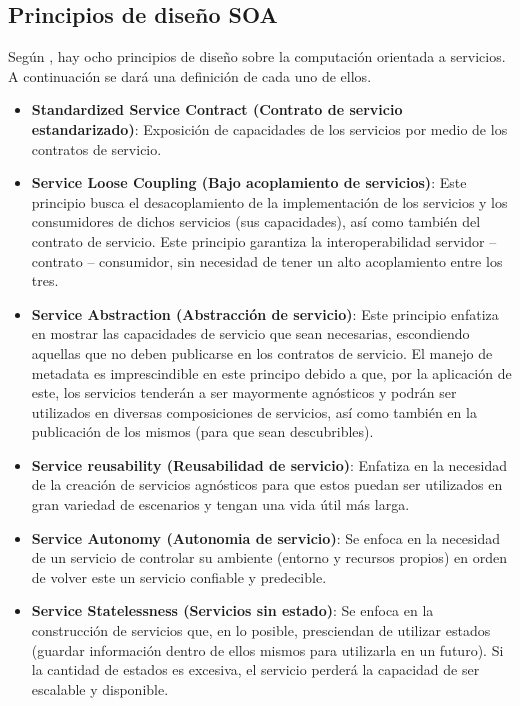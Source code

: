 \subsection{Principios de diseño SOA}

Según \cite{soa_principles}, hay ocho principios de diseño sobre la computación orientada a servicios. A continuación se dará una definición de cada uno de ellos.

\begin{itemize}
  \item \textbf{Standardized Service Contract (Contrato de servicio estandarizado)}: Exposición de capacidades de los servicios por medio de los contratos de servicio.

 \item \textbf{Service Loose Coupling (Bajo acoplamiento de servicios)}: Este principio busca el desacoplamiento de la implementación de los servicios y los consumidores de dichos servicios (sus capacidades), así como también del contrato de servicio. Este principio garantiza la interoperabilidad servidor – contrato – consumidor, sin necesidad de tener un alto acoplamiento entre los tres.

 \item \textbf{Service Abstraction (Abstracción de servicio)}: Este principio enfatiza en mostrar las capacidades de servicio que sean necesarias, escondiendo aquellas que no deben publicarse en los contratos de servicio. El manejo de metadata es imprescindible en este principo debido a que, por la aplicación de este, los servicios tenderán a ser mayormente agnósticos y podrán ser utilizados en diversas composiciones de servicios, así como también en la publicación de los mismos (para que sean descubribles).

 \item \textbf{Service reusability (Reusabilidad de servicio)}: Enfatiza en la necesidad de la creación de servicios agnósticos para que estos puedan ser utilizados en gran variedad de escenarios y tengan una vida útil más larga.

 \item \textbf{Service Autonomy (Autonomia de servicio)}: Se enfoca en la necesidad de un servicio de controlar su ambiente (entorno y recursos propios) en orden de volver este un servicio confiable y predecible.

 \item \textbf{Service Statelessness (Servicios sin estado)}: Se enfoca en la construcción de servicios que, en lo posible, presciendan de utilizar estados (guardar información dentro de ellos mismos para utilizarla en un futuro). Si la cantidad de estados es excesiva, el servicio perderá la capacidad de ser escalable y disponible.


\end{itemize}
